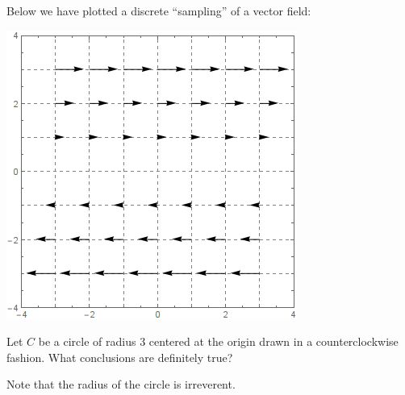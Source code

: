 \documentclass{ximera}
\begin{document}
\begin{exercise}
  Below we have plotted a discrete ``sampling'' of a vector field:
  \begin{image}
    \includegraphics{field6.png}
  \end{image}
  Let $C$ be a circle of radius $3$ centered at the origin drawn in a
  counterclockwise fashion.  What conclusions are definitely true?
  \begin{selectAll}
  \end{selectAll}
  \begin{hint}
    Note that the radius of the circle is irreverent. 
  \end{hint}
\end{exercise}
\end{document}
